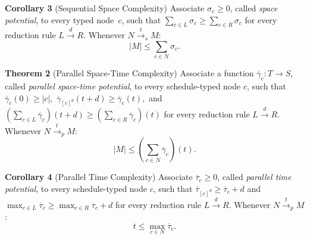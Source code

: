 \documentclass{fit-teorsem}
\begin{document}
\textbf{Corollary 3} (Sequential Space Complexity) Associate $\sigma_c \ge 0$, called
\textit{space potential}, to every typed node~$c$, such that
$\sum_{c \in L} \sigma_c \ge \sum_{c \in R} \sigma_c$
for every reduction rule $L \stackrel{d}{\longrightarrow} R$. Whenever
$N \stackrel{t}{\longrightarrow}_s M$: \[
	|M| \le \sum_{c \in N} \sigma_c
.\] 

\textbf{Theorem 2} (Parallel Space-Time Complexity) Associate a function $\overline{\gamma}_c : T \to S$,
called \textit{parallel space-time potential}, to every schedule-typed node $c$, such that
$\overline{\gamma}_c(0) \ge |c|,$ $\overline{\gamma}_{[c]^d}(t + d) \ge \overline{\gamma}_c(t),$
and $(\sum_{c \in L} \overline{\gamma}_c)(t + d) \ge (\sum_{c \in R} \overline{\gamma}_c)(t)$ for
every reduction rule $L \stackrel{d}{\longrightarrow} R$. Whenever
$N \stackrel{t}{\longrightarrow}_p M$: \[
	|M| \le \left( \sum_{c \in N} \overline{\gamma}_c \right)(t)
.\]

\textbf{Corollary 4} (Parallel Time Complexity) Associate $\overline{\tau}_c \ge 0$, called
\textit{parallel time potential}, to every schedule-typed node $c$, such that
$\overline{\tau}_{[c]^d} \ge \overline{\tau}_c + d$ and
$\max_{c \in L} \overline{\tau}_c \ge \max_{c \in R} \overline{\tau}_c + d$ for every reduction rule
$L \stackrel{d}{\longrightarrow} R$. Whenever $N \stackrel{t}{\longrightarrow}_p M$: \[
t \le \max_{c \in N} \overline{\tau}_c
.\]
\end{document}
